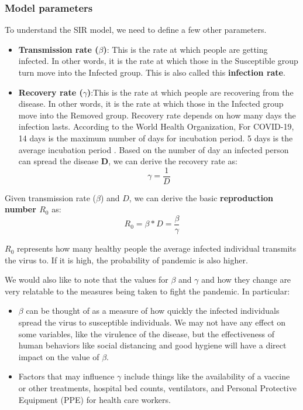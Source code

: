 \documentclass[11pt]{article}
\begin{document}
\subsubsection{Model parameters}
To understand the SIR model, we need to define a few other parameters.
\begin{itemize}
    \item \textbf{Transmission rate ($\beta $)}: This is the rate at which people are getting infected. In other words, it is the rate at which those in the Susceptible group turn move into the Infected group. This is also called this \textbf{infection rate}.
    \item \textbf{Recovery rate ($\gamma $)}:This is the rate at which people are recovering from the disease. In other words, it is the rate at which those in the Infected group move into the Removed group. Recovery rate depends on how many days the infection lasts. According to the World Health Organization, For COVID-19, 14 days is the maximum number of days for incubation period. 5 days is the average incubation period \cite{who-website}. Based on the number of day an infected person can spread the disease $\textbf{D}$, we can derive the recovery rate as:
    \begin{equation}
        \label{eq1}
        \gamma = \frac{1}{D}
    \end{equation}
\end{itemize}

Given transmission rate ($\beta$) and $D$, we can derive the basic \textbf{reproduction number $R_{0}$} as:
\begin{equation}
    \label{eq6}
    R_{0} = \beta * D = \frac{\beta}{\gamma}
\end{equation}

$R_{0}$ represents how many healthy people the average infected individual transmits the virus to. If it is high, the probability of pandemic is also higher.

We would also like to note that the values for $\beta$ and $\gamma$ and how they change are very relatable to the measures being taken to fight the pandemic. In particular:
\begin{itemize}
    \item $\beta$ can be thought of as a measure of how quickly the infected individuals spread the virus to susceptible individuals. We may not have any effect on some variables, like the virulence of the disease, but the effectiveness of human behaviors like social distancing and good hygiene will have a direct impact on the value of $\beta$.
    \item Factors that may influence $\gamma$ include things like the availability of a vaccine or other treatments, hospital bed counts, ventilators, and Personal Protective Equipment (PPE) for health care workers.
\end{itemize}
\end{document}

